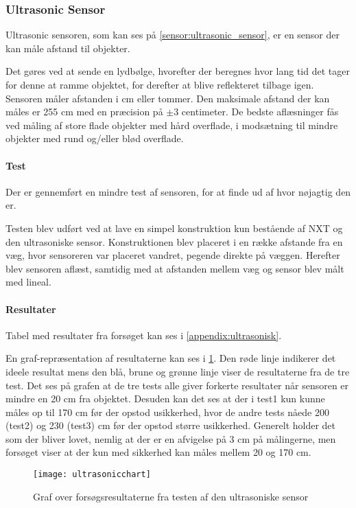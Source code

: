 \subsubsection{Ultrasonic Sensor}
Ultrasonic sensoren, som kan ses på \cref{sensor:ultrasonic_sensor}, er en sensor der kan måle afstand til objekter.

Det gøres ved at sende en lydbølge, hvorefter der beregnes hvor lang tid det tager for denne at ramme objektet, for derefter at blive reflekteret tilbage igen.
Sensoren måler afstanden i cm eller tommer.
Den maksimale afstand der kan måles er 255 cm med en præcision på $\pm$3 centimeter.
De bedste aflæsninger fås ved måling af store flade objekter med hård overflade, i modsætning til mindre objekter med rund og/eller blød overflade.\cite{nxt}

\paragraph{Test}
Der er gennemført en mindre test af sensoren, for at finde ud af hvor nøjagtig den er.

Testen blev udført ved at lave en simpel konstruktion kun bestående af NXT og den ultrasoniske sensor.
Konstruktionen blev placeret i en række afstande fra en væg, hvor sensoreren var placeret vandret, pegende direkte på væggen.
Herefter blev sensoren aflæst, samtidig med at afstanden mellem væg og sensor blev målt med lineal.

\paragraph{Resultater} Tabel med resultater fra forsøget kan ses i \cref{appendix:ultrasonisk}.

En graf-repræsentation af resultaterne kan ses i \cref{sensor:ultrasonic_resultat_diagram}.
Den røde linje indikerer det ideele resultat mens den blå, brune og grønne linje viser de resultaterne fra de tre test.
Det ses på grafen at de tre tests alle giver forkerte resultater når sensoren er mindre en 20 cm fra objektet.
Desuden kan det ses at der i test1 kun kunne måles op til 170 cm før der opstod usikkerhed, hvor de andre tests nåede 200 (test2) og 230 (test3) cm før der opstod større usikkerhed.
Generelt holder det som der bliver lovet, nemlig at der er en afvigelse på 3 cm på målingerne, men forsøget viser at der kun med sikkerhed kan måles mellem 20 og 170 cm.

\begin{figure}[h]
\centering
\texttt{[image: ultrasonicchart]}
\caption{Graf over forsøgsresultaterne fra testen af den ultrasoniske sensor}
\label{sensor:ultrasonic_resultat_diagram}
\end{figure}



